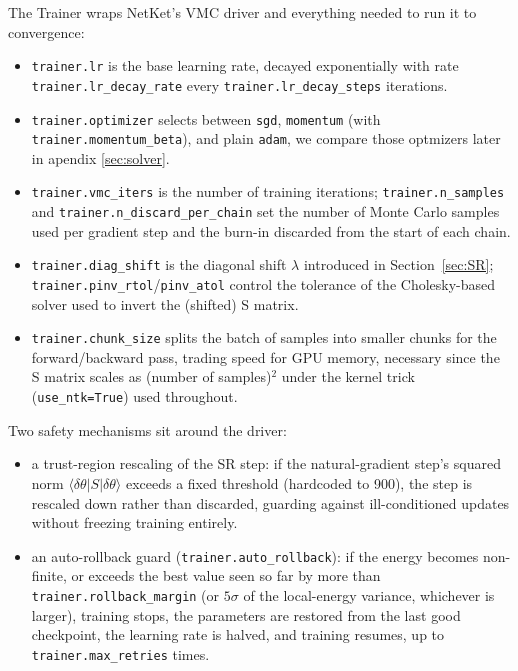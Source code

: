 \documentclass[a4paper,11pt,twoside]{article}
\begin{document}
The Trainer wraps NetKet's VMC driver and everything needed to run it to convergence:
\begin{itemize}
    \item \texttt{trainer.lr} is the base learning rate, decayed exponentially with rate \texttt{trainer.lr\_decay\_rate} every \texttt{trainer.lr\_decay\_steps} iterations.
    \item \texttt{trainer.optimizer} selects between \texttt{sgd}, \texttt{momentum} (with \texttt{trainer.momentum\_beta}), and plain \texttt{adam}, we compare those optmizers later in apendix \ref{sec:solver}.
    \item \texttt{trainer.vmc\_iters} is the number of training iterations; \texttt{trainer.n\_samples} and \texttt{trainer.n\_discard\_per\_chain} set the number of Monte Carlo samples used per gradient step and the burn-in discarded from the start of each chain.
    \item \texttt{trainer.diag\_shift} is the diagonal shift $\lambda$ introduced in Section~\ref{sec:SR}; \texttt{trainer.pinv\_rtol}/\texttt{pinv\_atol} control the tolerance of the Cholesky-based solver used to invert the (shifted) S matrix.
    \item \texttt{trainer.chunk\_size} splits the batch of samples into smaller chunks for the forward/backward pass, trading speed for GPU memory, necessary since the S matrix scales as (number of samples)$^2$ under the kernel trick (\texttt{use\_ntk=True}) used throughout.
\end{itemize}

Two safety mechanisms sit around the driver:
\begin{itemize}
    \item a trust-region rescaling of the SR step: if the natural-gradient step's squared norm $\langle \delta\theta | S | \delta\theta\rangle$ exceeds a fixed threshold (hardcoded to 900), the step is rescaled down rather than discarded, guarding against ill-conditioned updates without freezing training entirely.
    \item an auto-rollback guard (\texttt{trainer.auto\_rollback}): if the energy becomes non-finite, or exceeds the best value seen so far by more than \texttt{trainer.rollback\_margin} (or $5\sigma$ of the local-energy variance, whichever is larger), training stops, the parameters are restored from the last good checkpoint, the learning rate is halved, and training resumes, up to \texttt{trainer.max\_retries} times.
\end{itemize}
\end{document}
